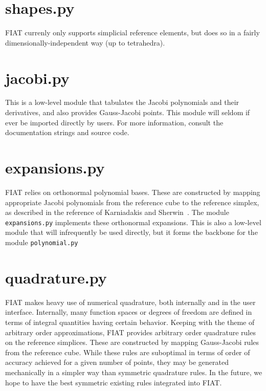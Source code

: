 \documentclass{fenicsmanual}
\begin{document}
\section{shapes.py}
FIAT currenly only supports simplicial reference elements, but does so
in a fairly dimensionally-independent way (up to tetrahedra).

\section{jacobi.py}
This is a low-level module that tabulates the Jacobi polynomials and
their derivatives, and also provides Gauss-Jacobi points.  This module
will seldom if ever be imported directly by users.  For more
information, consult the documentation strings and source code.

\section{expansions.py}
FIAT relies on orthonormal polynomial bases.  These are constructed by
mapping appropriate Jacobi polynomials from the reference cube to the
reference simplex, as described in the reference of Karniadakis and
Sherwin~\cite{}.  The module \texttt{expansions.py} implements these
orthonormal expansions.  This is also a low-level module that will
infrequently be used directly, but it forms the backbone for the
module \texttt{polynomial.py}

\section{quadrature.py}
FIAT makes heavy use of numerical quadrature, both internally and in
the user interface.  Internally, many function spaces or degrees of
freedom are defined in terms of integral quantities having certain
behavior.  Keeping with the theme of arbitrary order approximations,
FIAT provides arbitrary order quadrature rules on the reference
simplices.  These are constructed by mapping Gauss-Jacobi rules from
the reference cube.  While these rules are suboptimal in terms of
order of accuracy achieved for a given number of points, they may be
generated mechanically in a simpler way than symmetric quadrature
rules.  In the future, we hope to have the best symmetric existing
rules integrated into FIAT.
\end{document}
